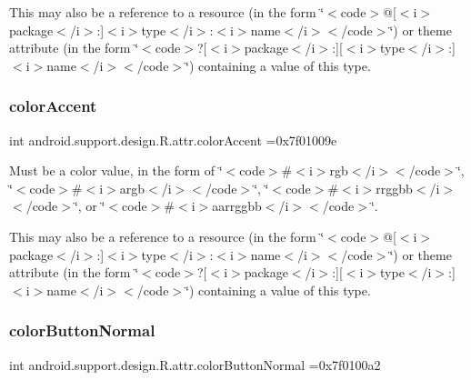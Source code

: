 This may also be a reference to a resource (in the form \char`\"{}$<$code$>$@\mbox{[}$<$i$>$package$<$/i$>$\+:\mbox{]}$<$i$>$type$<$/i$>$\+:$<$i$>$name$<$/i$>$$<$/code$>$\char`\"{}) or theme attribute (in the form \char`\"{}$<$code$>$?\mbox{[}$<$i$>$package$<$/i$>$\+:\mbox{]}\mbox{[}$<$i$>$type$<$/i$>$\+:\mbox{]}$<$i$>$name$<$/i$>$$<$/code$>$\char`\"{}) containing a value of this type. \mbox{\label{classandroid_1_1support_1_1design_1_1R_1_1attr_a34c84599954f6b50d417431a1fc96ff5}} 
\subsubsection{\texorpdfstring{color\+Accent}{colorAccent}}
{\footnotesize\ttfamily int android.\+support.\+design.\+R.\+attr.\+color\+Accent =0x7f01009e\hspace{0.3cm}{\ttfamily [static]}}

Must be a color value, in the form of \char`\"{}$<$code$>$\#$<$i$>$rgb$<$/i$>$$<$/code$>$\char`\"{}, \char`\"{}$<$code$>$\#$<$i$>$argb$<$/i$>$$<$/code$>$\char`\"{}, \char`\"{}$<$code$>$\#$<$i$>$rrggbb$<$/i$>$$<$/code$>$\char`\"{}, or \char`\"{}$<$code$>$\#$<$i$>$aarrggbb$<$/i$>$$<$/code$>$\char`\"{}. 

This may also be a reference to a resource (in the form \char`\"{}$<$code$>$@\mbox{[}$<$i$>$package$<$/i$>$\+:\mbox{]}$<$i$>$type$<$/i$>$\+:$<$i$>$name$<$/i$>$$<$/code$>$\char`\"{}) or theme attribute (in the form \char`\"{}$<$code$>$?\mbox{[}$<$i$>$package$<$/i$>$\+:\mbox{]}\mbox{[}$<$i$>$type$<$/i$>$\+:\mbox{]}$<$i$>$name$<$/i$>$$<$/code$>$\char`\"{}) containing a value of this type. \mbox{\label{classandroid_1_1support_1_1design_1_1R_1_1attr_a9aab1b1f5f5e55e485569f56f4a23d6c}} 
\subsubsection{\texorpdfstring{color\+Button\+Normal}{colorButtonNormal}}
{\footnotesize\ttfamily int android.\+support.\+design.\+R.\+attr.\+color\+Button\+Normal =0x7f0100a2\hspace{0.3cm}{\ttfamily [static]}}

